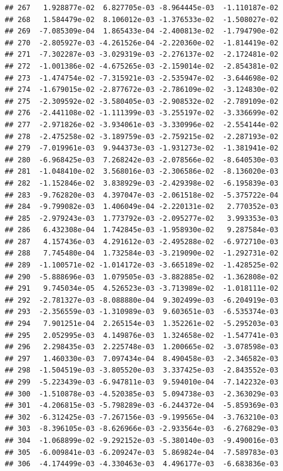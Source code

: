 \documentclass[
]{article}
\begin{document}
\begin{verbatim}
## 267   1.928877e-02  6.827705e-03 -8.964445e-03  -1.110187e-02
## 268   1.584479e-02  8.106012e-03 -1.376533e-02  -1.508027e-02
## 269  -7.085309e-04  1.865433e-04 -2.400813e-02  -1.794790e-02
## 270  -2.805927e-03 -4.261526e-04 -2.220360e-02  -1.814419e-02
## 271  -7.302287e-03 -3.029319e-03 -2.276137e-02  -2.172481e-02
## 272  -1.001386e-02 -4.675265e-03 -2.159014e-02  -2.854381e-02
## 273  -1.474754e-02 -7.315921e-03 -2.535947e-02  -3.644698e-02
## 274  -1.679015e-02 -2.877672e-03 -2.786109e-02  -3.124830e-02
## 275  -2.309592e-02 -3.580405e-03 -2.908532e-02  -2.789109e-02
## 276  -2.441108e-02 -1.111399e-03 -3.255197e-02  -3.336699e-02
## 277  -2.971826e-02 -3.934061e-03 -3.330996e-02  -2.554144e-02
## 278  -2.475258e-02 -3.189759e-03 -2.759215e-02  -2.287193e-02
## 279  -7.019961e-03  9.944373e-03 -1.931273e-02  -1.381941e-02
## 280  -6.968425e-03  7.268242e-03 -2.078566e-02  -8.640530e-03
## 281  -1.048410e-02  3.568016e-03 -2.306586e-02  -8.136020e-03
## 282  -1.152846e-02  3.838929e-03 -2.429398e-02  -6.195839e-03
## 283  -9.762820e-03  4.397047e-03 -2.061518e-02  -5.375722e-04
## 284  -9.799082e-03  1.406049e-04 -2.220131e-02   2.770352e-03
## 285  -2.979243e-03  1.773792e-03 -2.095277e-02   3.993353e-03
## 286   6.432308e-04  1.742845e-03 -1.958930e-02   9.287584e-03
## 287   4.157436e-03  4.291612e-03 -2.495288e-02  -6.972710e-03
## 288   7.745480e-04  1.732584e-03 -3.219090e-02  -1.292731e-02
## 289  -1.100571e-02 -1.014172e-03 -3.665189e-02  -1.428525e-02
## 290  -5.888696e-03  1.079505e-03 -3.882885e-02  -1.362808e-02
## 291   9.745034e-05  4.526523e-03 -3.713989e-02  -1.018111e-02
## 292  -2.781327e-03 -8.088880e-04  9.302499e-03  -6.204919e-03
## 293  -2.356559e-03 -1.310989e-03  9.603651e-03  -6.535374e-03
## 294   7.901251e-04  2.265154e-03  1.352261e-02  -5.295203e-03
## 295   2.052995e-03  4.149876e-03  1.324658e-02  -1.547741e-03
## 296   2.298435e-03  2.225748e-03  1.200665e-02  -3.078598e-03
## 297   1.460330e-03  7.097434e-04  8.490458e-03  -2.346582e-03
## 298  -1.504519e-03 -3.805520e-03  3.337425e-03  -2.843552e-03
## 299  -5.223439e-03 -6.947811e-03  9.594010e-04  -7.142232e-03
## 300  -1.510878e-03 -4.520385e-03  5.094738e-03  -2.363029e-03
## 301  -4.206815e-03 -5.798289e-03 -6.244372e-04  -5.859369e-03
## 302  -6.312425e-03 -7.267156e-03 -9.199565e-04  -3.763210e-03
## 303  -8.396105e-03 -8.626966e-03 -2.933564e-03  -6.276829e-03
## 304  -1.068899e-02 -9.292152e-03 -5.380140e-03  -9.490016e-03
## 305  -6.009841e-03 -6.209247e-03  5.869824e-04  -7.589783e-03
## 306  -4.174499e-03 -4.330463e-03  4.496177e-03  -6.683836e-03

\end{verbatim}
\end{document}
